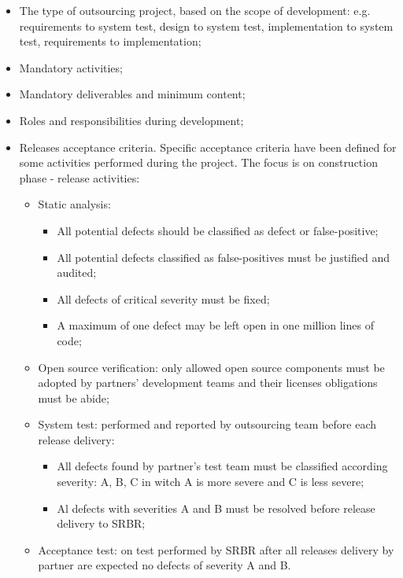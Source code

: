 \begin{itemize}
\item The type of outsourcing project, based on the scope of development: e.g.  requirements to system test, design to system test, implementation to system test, requirements to implementation;
\item Mandatory activities;
\item Mandatory deliverables and minimum content;
\item Roles and responsibilities during development;
\item Releases acceptance criteria. Specific acceptance criteria have been defined for some activities performed during the project. The focus is on construction phase - release activities:
  \begin{itemize}
  \item Static analysis: 
      \begin{itemize}
      \item All potential defects should be classified as defect or false-positive;
      \item All potential defects classified as false-positives must be justified and audited;
      \item All defects of critical severity must be fixed;
      \item A maximum of one defect may be left open in one million lines of code;
      \end{itemize}
  \item Open source verification: only allowed open source components must be adopted by partners' development teams and their licenses obligations must be abide;
  \item System test: performed and reported by outsourcing team before each release delivery: 
      \begin{itemize}
      \item All defects found by partner's test team must be classified according severity: A, B, C in witch A is more severe and C is less severe;
      \item Al defects with severities A and B must be resolved before release delivery to SRBR;
      \end{itemize}
   \item Acceptance test: on test performed by SRBR after all releases delivery by partner are expected no defects of severity A and B.
   \end{itemize}
\end{itemize}

